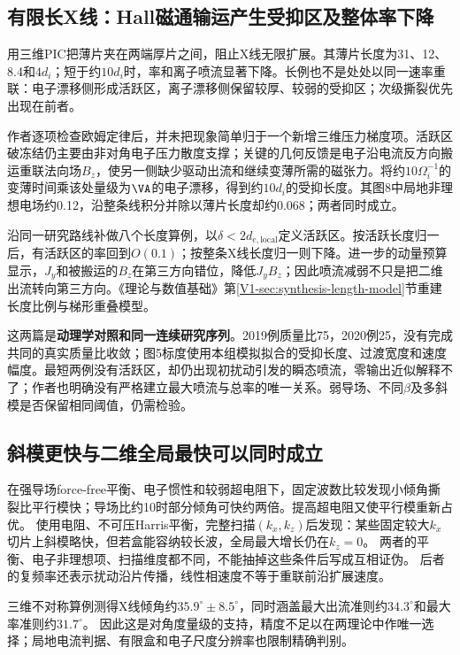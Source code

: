 \documentclass[UTF8,a4paper,11pt,openany,fontset=fandol]{ctexbook}
\begin{document}
\subsection{有限长X线：Hall磁通输运产生受抑区及整体率下降}\label{sec:synthesis-finite}
\citet{F659}用三维PIC把薄片夹在两端厚片之间，阻止X线无限扩展。其薄片长度为31、12、8.4和$4d_i$；短于约$10d_i$时，率和离子喷流显著下降。长例也不是处处以同一速率重联：电子漂移侧形成活跃区，离子漂移侧保留较厚、较弱的受抑区；次级撕裂优先出现在前者。

作者逐项检查欧姆定律后，并未把现象简单归于一个新增三维压力梯度项。活跃区破冻结仍主要由非对角电子压力散度支撑；关键的几何反馈是电子沿电流反方向搬运重联法向场$B_z$，使另一侧缺少驱动出流和继续变薄所需的磁张力。将约$10\Omega_i^{-1}$的变薄时间乘该处量级为$\VA$的电子漂移，得到约$10d_i$的受抑长度。其图8中局地非理想电场约0.12，沿整条线积分并除以薄片长度却约0.068；两者同时成立。

\citet{F792}沿同一研究路线补做八个长度算例，以$\delta<2d_{e,\mathrm{local}}$定义活跃区。按活跃长度归一后，有活跃区的率回到$O(0.1)$；按整条X线长度归一则下降。进一步的动量预算显示，$J_y$和被搬运的$B_z$在第三方向错位，降低$J_yB_z$；因此喷流减弱不只是把二维出流转向第三方向。《理论与数值基础》第\ref{V1-sec:synthesis-length-model}节重建长度比例与梯形重叠模型。

这两篇是\textbf{动理学对照和同一连续研究序列}。2019例质量比75，2020例25，没有完成共同的真实质量比收敛；图5标度使用本组模拟拟合的受抑长度、过渡宽度和速度幅度。最短两例没有活跃区，却仍出现初扰动引发的瞬态喷流，零输出近似解释不了；作者也明确没有严格建立最大喷流与总率的唯一关系。弱导场、不同$\beta$及多斜模是否保留相同阈值，仍需检验。

\subsection{斜模更快与二维全局最快可以同时成立}
\citet{L224}在强导场force-free平衡、电子惯性和较弱超电阻下，固定波数比较发现小倾角撕裂比平行模快；导场比约10时部分倾角可快约两倍。提高超电阻又使平行模重新占优。
\citet{L268}使用电阻、不可压Harris平衡，完整扫描$(k_x,k_z)$后发现：某些固定较大$k_x$切片上斜模略快，但若盒能容纳较长波，全局最大增长仍在$k_z=0$。
两者的平衡、电子非理想项、扫描维度都不同，不能抽掉这些条件后写成互相证伪。
后者的复频率还表示扰动沿片传播，线性相速度不等于重联前沿扩展速度。

\citet{L166}三维不对称算例测得X线倾角约$35.9^\circ\pm8.5^\circ$，同时涵盖最大出流准则约$34.3^\circ$和最大率准则约$31.7^\circ$。
因此这是对角度量级的支持，精度不足以在两理论中作唯一选择；局地电流判据、有限盒和电子尺度分辨率也限制精确判别。
\end{document}

